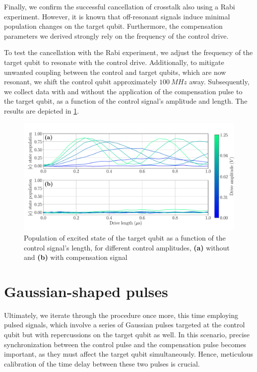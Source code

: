 Finally, we confirm the successful cancellation of crosstalk also using a Rabi experiment. 
However, it is known that off-resonant signals induce minimal population changes on the target qubit. 
Furthermore, the compensation parameters we derived strongly rely on the frequency of the control drive.

To test the cancellation with the Rabi experiment, we adjust the frequency of the target qubit to resonate with the control drive. 
Additionally, to mitigate unwanted coupling between the control and target qubits, which are now resonant, we shift the control qubit approximately $\SI{100}{MHz}$ away. 
Subsequently, we collect data with and without the application of the compensation pulse to the target qubit, as a function of the control signal's amplitude and length.
The results are depicted in \cref{fig:Rabi_flattop_canc}.

\begin{figure}
    \centering
    \includegraphics[width=1\linewidth]{Images//Chap2.0/Raby_flattop_cancellation.pdf}
    \vspace{-0.8cm}
    \caption{Population of excited state of the target qubit as a function of the control signal's length, for different control amplitudes, \textbf{(a)} without and \textbf{(b)} with compensation signal}
    \label{fig:Rabi_flattop_canc}
\end{figure}

\section{Gaussian-shaped pulses}
\label{sec:gaussian_shaped}

Ultimately, we iterate through the procedure once more, this time employing pulsed signals, which involve a series of Gaussian pulses targeted at the control qubit but with repercussions on the target qubit as well.
In this scenario, precise synchronization between the control pulse and the compensation pulse becomes important, as they must affect the target qubit simultaneously.
Hence, meticulous calibration of the time delay between these two pulses is crucial.

